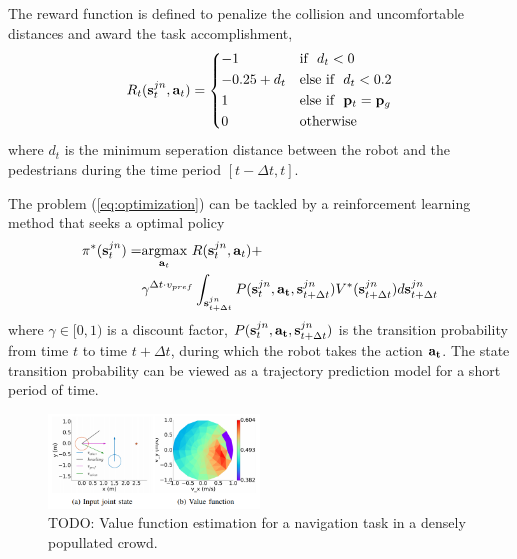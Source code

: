 \documentclass[letterpaper, 10 pt, conference]{ieeeconf}  %
\begin{document}
The reward function is defined to penalize the collision and uncomfortable distances and award the task accomplishment, 
\begin{equation}
    R_t(\bold{s}_t^{jn},\bold{a}_t)= 
\begin{dcases}
    -1 & \text{if} ~~ d_t < 0 \\
    -0.25 + d_t & \text{else if} ~~ d_t < 0.2 \\
    1 & \text{else if} ~~ \bold{p}_t=\bold{p}_g \\
    0 & \text{otherwise} 
\end{dcases}
\end{equation}
where $d_t$ is the minimum seperation distance between the robot and the pedestrians during the time period $[t-\Delta t,t]$. 

The problem (\ref{eq:optimization}) can be tackled by a reinforcement learning method that seeks a optimal policy 
\begin{equation} \label{eq:RL}
\begin{split}
\pi^{*}(\bold{s}_t^{jn}) = & \underset{\bold{a}_t}{\text{argmax}} ~ R(\bold{s}_t^{jn},\bold{a}_t) + \\
& \gamma^{\Delta t \cdot v_{pref}} \int_{\bold{s}_{t+\Delta t}^{jn}} P(\bold{s}_t^{jn},\bold{a_t},\bold{s}_{t+\Delta t}^{jn}) V^*(\bold{s}_{t+\Delta t}^{jn}) d\bold{s}_{t+\Delta t}^{jn}
\end{split}
\end{equation}
where $\gamma \in [0,1)$ is a discount factor, $P(\bold{s}_t^{jn},\bold{a_t},\bold{s}_{t+\Delta t}^{jn}) $ is the transition probability from time $t$ to time $t+\Delta t$, during which the robot takes the action $\bold{a_t}$. The state transition probability can be viewed as a trajectory prediction model for a short period of time. 

\begin{figure} [t]
  \captionsetup{font=small}
  \includegraphics[width=0.5\textwidth]{figures/vf} 
  \caption{TODO: Value function estimation for a navigation task in a densely popullated crowd.}
  \label{fig:overview}
\end{figure}
\end{document}
